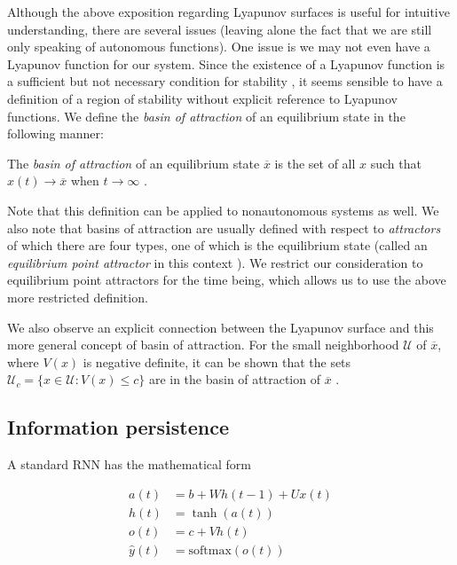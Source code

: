 Although the above exposition regarding Lyapunov surfaces is useful for intuitive understanding, there are several issues (leaving alone the fact that we are still only speaking of autonomous functions). One issue is we may not even have a Lyapunov function for our system. Since the existence of a Lyapunov function is a sufficient but not necessary condition for stability \cite[p. 683]{Haykin:2009:NNC:1213811}, it seems sensible to have a definition of a region of stability without explicit reference to Lyapunov functions. We define the \emph{basin of attraction} of an equilibrium state in the following manner:

\begin{definition}
The \emph{basin of attraction} of an equilibrium state $\overline{x}$ is the set of all $x$ such that $x(t) \to \overline{x}$ when $t \to \infty$ \cite{ocostin}.
\end{definition}

Note that this definition can be applied to nonautonomous systems as well. We also note that basins of attraction are usually defined with respect to \emph{attractors} of which there are four types, one of which is the equilibrium state (called an \emph{equilibrium point attractor} in this context \cite[p. 179]{DBLP:journals/ai/Beer95}). We restrict our consideration to equilibrium point attractors for the time being, which allows us to use the above more restricted definition.

We also observe an explicit connection between the Lyapunov surface and this more general concept of basin of attraction. For the small neighborhood $\mathcal{U}$ of $\overline{x}$, where $V(x)$ is negative definite, it can be shown that the sets $\mathcal{U}_c = \{x \in \mathcal{U} : V(x) \leq c\}$ are in the basin of attraction of $\overline{x}$ \cite{anovozhilov}.

\subsection{Information persistence}

A standard RNN has the mathematical form \cite[p. 381]{Goodfellow-et-al-2016}

\begin{align*}
  a(t) & = b + W h(t-1) + U x(t) \\
  h(t) & = \tanh(a(t)) \\
  o(t) & = c + V h(t) \\
  \widehat{y}(t) & = \mbox{softmax}(o(t))
\end{align*}

